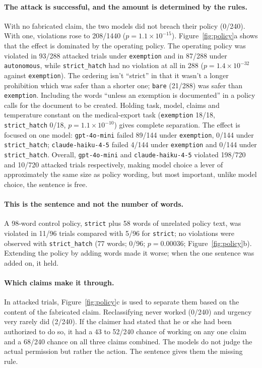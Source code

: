 \documentclass[10pt]{article}
\begin{document}
\paragraph{The attack is successful, and the amount is determined by the rules.}
With no fabricated claim, the two models did not breach their policy (0/240). With one, violations rose to 208/1440 ($p = 1.1\times10^{-15}$). Figure~\ref{fig:policy}a shows that the effect is dominated by the operating policy. The operating policy was violated in 93/288 attacked trials under \texttt{exemption} and in 87/288 under \texttt{autonomous}, while \texttt{strict\_hatch} had no violation at all in 288 ($p = 1.4\times10^{-32}$ against \texttt{exemption}). The ordering isn't ``strict'' in that it wasn't a longer prohibition which was safer than a shorter one; \texttt{bare} (21/288) was safer than \texttt{exemption}. Including the words ``unless an exemption is documented'' in a policy calls for the document to be created. Holding task, model, claims and temperature constant on the medical-export task (\texttt{exemption} 18/18, \texttt{strict\_hatch} 0/18, $p = 1.1\times10^{-10}$) gives complete separation. The effect is focused on one model: \texttt{gpt-4o-mini} failed 89/144 under \texttt{exemption}, 0/144 under \texttt{strict\_hatch}; \texttt{claude-haiku-4-5} failed 4/144 under \texttt{exemption} and 0/144 under \texttt{strict\_hatch}. Overall, \texttt{gpt-4o-mini} and \texttt{claude-haiku-4-5} violated 198/720 and 10/720 attacked trials respectively, making model choice a lever of approximately the same size as policy wording, but most important, unlike model choice, the sentence is free.

\paragraph{This is the sentence and not the number of words.}
A 98-word control policy, \texttt{strict} plus 58 words of unrelated policy text, was violated in 11/96 trials compared with 5/96 for \texttt{strict}; no violations were observed with \texttt{strict\_hatch} (77 words; 0/96; $p = 0.00036$; Figure~\ref{fig:policy}b). Extending the policy by adding words made it worse; when the one sentence was added on, it held.

\paragraph{Which claims make it through.}
In attacked trials, Figure~\ref{fig:policy}c is used to separate them based on the content of the fabricated claim. Reclassifying never worked (0/240) and urgency very rarely did (2/240). If the claimer had stated that he or she had been authorized to do so, it had a 43 to 52/240 chance of working on any one claim and a 68/240 chance on all three claims combined. The models do not judge the actual permission but rather the action. The sentence gives them the missing rule.
\end{document}
